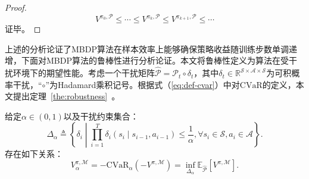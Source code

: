 \begin{proof}
\begin{equation}
{V}^{\pi_{0}, \mathcal{P}} \leq \cdots \leq {V}^{\pi_{k}, \mathcal{P}} \leq {V}^{\pi_{k+1}, \mathcal{P}} \leq \cdots
\end{equation}
证毕。
\end{proof}

上述的分析论证了MBDP算法在样本效率上能够确保策略收益随训练步数单调递增，下面对MBDP算法的鲁棒性进行分析论证。本文将鲁棒性定义为算法在受干扰环境下的期望性能。考虑一个干扰矩阵$\hat{\mathcal{P}}=\mathcal{P}_t \circ \delta_t$，其中$\delta_t\in\mathbb{R}^{\mathcal{S}\times\mathcal{A}\times\mathcal{S}}$为可积概率干扰，“$\circ$”为Hadamard乘积记号。根据式（\ref{eq:def-cvar}）中对$\mathrm{CVaR}$的定义，本文提出定理~\ref{the:robustness}~。

\begin{theorem}\label{the:robustness}
给定$\alpha\in(0,1)$以及干扰约束集合：
\begin{equation}\label{eq:supp-perturbation}
    \Delta_\alpha \triangleq \left\{\delta_i\middle\vert\prod_{i=1}^{T}\delta_i(s_i\mid s_{i-1},a_{i-1})\leq \frac{1}{\alpha}, \forall s_i\in\mathcal{S}, a_i\in\mathcal{A}\right\}.
\end{equation}
存在如下关系：
\begin{equation}\label{eq:return-cvar-rob}
    V_\alpha^{\pi,\mathcal{M}} = -\mathrm{CVaR}_\alpha\left(-V^{\pi,\mathcal{M}}\right)=\inf\limits_{\Delta_\alpha}\mathbb{E}_{\hat{\mathcal{P}}}\left[V^{\pi,\mathcal{M}}\right].
\end{equation}
\end{theorem}

